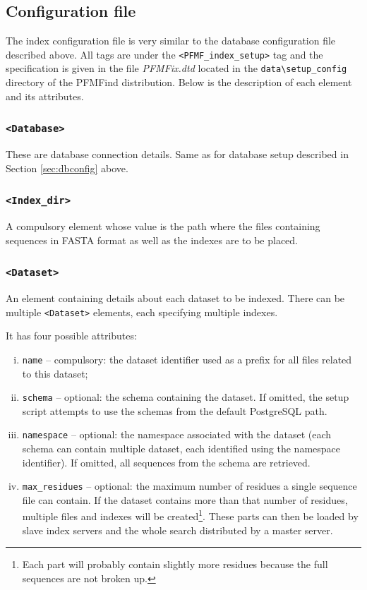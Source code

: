 \documentclass[11pt]{article}
\begin{document}
\subsection{Configuration file}\label{sec:ixconfig}

The index configuration file is very similar to the database configuration file described above. All tags are under the {\tt <PFMF\_index\_setup>} tag and the specification is given in the file {\it PFMFix.dtd} located in the \verb|data\setup_config| directory of the PFMFind distribution. Below is the description of each element and its attributes.

\subsubsection*{{\tt <Database>}}

These are database connection details. Same as for database setup described in Section \ref{sec:dbconfig} above.

\subsubsection*{\texttt{<Index\_dir>}}

A compulsory element whose value is the path where the files containing sequences in FASTA format as well as the indexes are to be placed.

\subsubsection*{\texttt{<Dataset>}}

An element containing details about each dataset to be indexed. There can be multiple \texttt{<Dataset>} elements, each specifying multiple indexes.

It has four possible attributes:
\begin{enumerate}[(i)]
\item \texttt{name} -- compulsory: the dataset identifier used as a prefix for all files related to this dataset;
\item \texttt{schema} -- optional: the schema containing the dataset. If omitted, the setup script attempts to use the schemas from the default PostgreSQL path.
\item \texttt{namespace} -- optional: the namespace associated with the dataset (each schema can contain multiple dataset, each identified using the namespace identifier). If omitted, all sequences from the schema are retrieved.
\item \texttt{max\_residues} -- optional: the maximum number of residues a single sequence file can contain. If the dataset contains more than that number of residues, multiple files and indexes will be created\footnote{Each part will probably contain slightly more residues because the full sequences are not broken up.}. These parts can then be loaded by slave index servers and the whole search distributed by a master server.
\end{enumerate}
\end{document}
